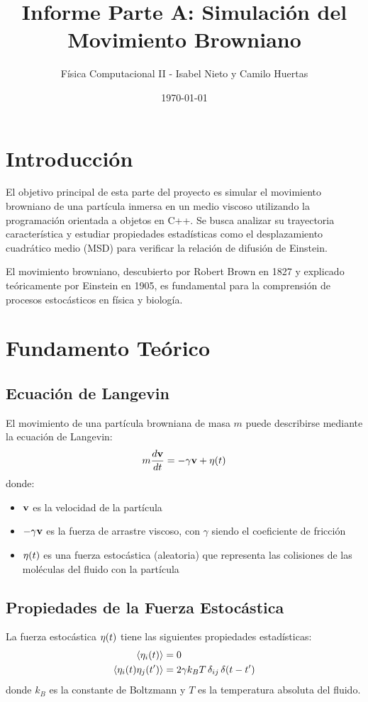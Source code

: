\documentclass[11pt,a4paper]{article}
\title{Informe Parte A: Simulación del Movimiento Browniano}
\author{Física Computacional II - Isabel Nieto y Camilo Huertas}
\date{\today}
\begin{document}
\maketitle
\tableofcontents
\newpage

\section{Introducción}
El objetivo principal de esta parte del proyecto es simular el movimiento browniano de una partícula inmersa en un medio viscoso utilizando la programación orientada a objetos en C++. Se busca analizar su trayectoria característica y estudiar propiedades estadísticas como el desplazamiento cuadrático medio (MSD) para verificar la relación de difusión de Einstein.

El movimiento browniano, descubierto por Robert Brown en 1827 y explicado teóricamente por Einstein en 1905, es fundamental para la comprensión de procesos estocásticos en física y biología.

\section{Fundamento Teórico}

\subsection{Ecuación de Langevin}
El movimiento de una partícula browniana de masa $m$ puede describirse mediante la ecuación de Langevin:
\begin{equation}
    m\frac{d\vb{v}}{dt} = -\gamma\vb{v} + \vb{\eta}(t)
    \label{eq:langevin}
\end{equation}
donde:
\begin{itemize}
    \item $\vb{v}$ es la velocidad de la partícula
    \item $-\gamma\vb{v}$ es la fuerza de arrastre viscoso, con $\gamma$ siendo el coeficiente de fricción
    \item $\vb{\eta}(t)$ es una fuerza estocástica (aleatoria) que representa las colisiones de las moléculas del fluido con la partícula
\end{itemize}

\subsection{Propiedades de la Fuerza Estocástica}
La fuerza estocástica $\vb{\eta}(t)$ tiene las siguientes propiedades estadísticas:
\begin{align}
    \expval{\eta_i(t)} &= 0 \\
    \expval{\eta_i(t)\eta_j(t')} &= 2\gamma k_B T\,\delta_{ij}\,\delta(t-t')
    \label{eq:fuerza_estocastica}
\end{align}
donde $k_B$ es la constante de Boltzmann y $T$ es la temperatura absoluta del fluido.
\end{document}
